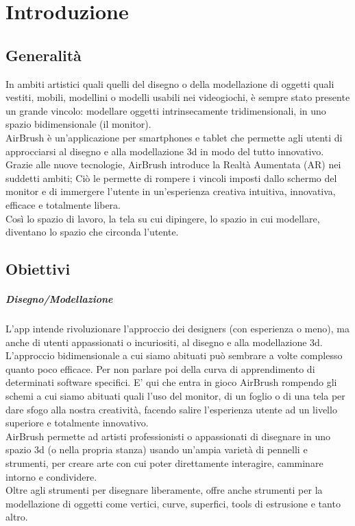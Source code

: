 \documentclass[11pt,fleqn]{book} %
\begin{document}


\chapter{Introduzione}

\section{Generalità}
In ambiti artistici quali quelli del disegno o della modellazione di oggetti quali vestiti, mobili, modellini o modelli usabili nei videogiochi, è sempre stato presente un grande vincolo: modellare oggetti intrinsecamente tridimensionali, in uno spazio bidimensionale (il monitor).\\
AirBrush è un'applicazione per smartphones e tablet che permette agli utenti di approcciarsi al disegno e alla modellazione 3d in modo del tutto innovativo. \\
Grazie alle nuove tecnologie, AirBrush introduce la Realtà Aumentata (AR) nei suddetti ambiti; Ciò le permette di rompere i vincoli imposti dallo schermo del monitor e di immergere l'utente in un'esperienza creativa intuitiva, innovativa, efficace e totalmente libera.\\
Così lo spazio di lavoro, la tela su cui dipingere, lo spazio in cui modellare, diventano lo spazio che circonda l'utente.

\section{Obiettivi}
\paragraph{Disegno/Modellazione} L'app intende rivoluzionare l'approccio dei designers (con esperienza o meno), ma anche di utenti appassionati o incuriositi, al disegno e alla modellazione 3d. \\
L'approccio bidimensionale a cui siamo abituati può sembrare a volte complesso quanto poco efficace. Per non parlare poi della curva di apprendimento di determinati software specifici. E' qui che entra in gioco AirBrush rompendo gli schemi a cui siamo abituati quali l'uso del monitor, di un foglio o di una tela per dare sfogo alla nostra creatività, facendo salire l'esperienza utente ad un livello superiore e totalmente innovativo.\\
AirBrush permette ad artisti professionisti o appassionati di disegnare in uno spazio 3d (o nella propria stanza) usando un'ampia varietà di pennelli e strumenti, per creare arte con cui poter direttamente interagire, camminare intorno e condividere.\\
Oltre agli strumenti per disegnare liberamente, offre anche strumenti per la modellazione di oggetti come vertici, curve, superfici, tools di estrusione e tanto altro.
\end{document}
